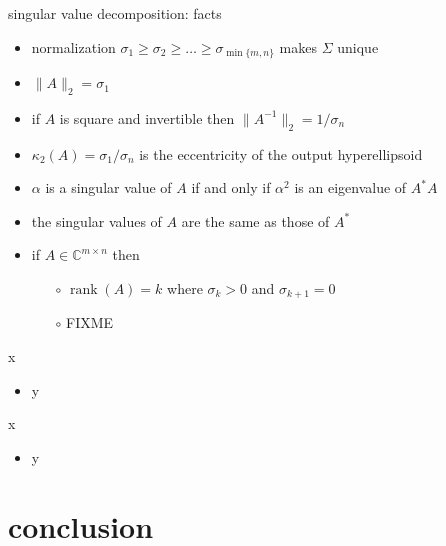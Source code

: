 \documentclass[10pt,hyperref]{beamer}
\newcommand{\CC}{\mathbb{C}}
\newcommand{\rank}{\operatorname{rank}}
\begin{document}
\begin{frame}{singular value decomposition: facts}

\begin{itemize}
\item normalization $\sigma_1\ge \sigma_2 \ge \dots \ge \sigma_{\min\{m,n\}}$ makes $\Sigma$ unique
\item $\|A\|_2=\sigma_1$
\item if $A$ is square and invertible then $\|A^{-1}\|_2 = 1/\sigma_n$
\item $\kappa_2(A) = \sigma_1/\sigma_n$ is the eccentricity of the output hyperellipsoid
\item $\alpha$ is a singular value of $A$ if and only if $\alpha^2$ is an eigenvalue of $A^*A$
\item the singular values of $A$ are the same as those of $A^*$
\item if $A\in \CC^{m\times n}$ then
    \begin{itemize}
    \item[$\circ$] $\rank(A)=k$ where $\sigma_k>0$ and $\sigma_{k+1}=0$
    \item[$\circ$] FIXME
    \end{itemize}
\end{itemize}
\end{frame}

\begin{frame}{x}

\begin{itemize}
\item y
\end{itemize}
\end{frame}

\begin{frame}{x}

\begin{itemize}
\item y
\end{itemize}
\end{frame}


\section{conclusion}
\end{document}
